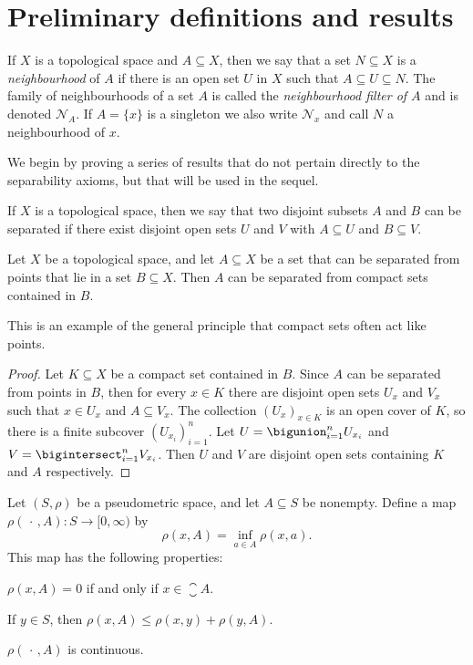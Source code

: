 \documentclass[article, a4paper, 11pt, oneside]{memoir}
\numberwithin{equation}{chapter}
\newcommand{\calN}{\mathcal{N}}
\newcommand{\nhoodfilter}[1]{\calN_{#1}}
\begin{document}
\chapter{Preliminary definitions and results}

If $X$ is a topological space and $A \subseteq X$, then we say that a set $N \subseteq X$ is a \emph{neighbourhood} of $A$ if there is an open set $U$ in $X$ such that $A \subseteq U \subseteq N$. The family of neighbourhoods of a set $A$ is called the \emph{neighbourhood filter of $A$} and is denoted $\nhoodfilter{A}$. If $A = \{x\}$ is a singleton we also write $\nhoodfilter{x}$ and call $N$ a neighbourhood of $x$.

We begin by proving a series of results that do not pertain directly to the separability axioms, but that will be used in the sequel.

If $X$ is a topological space, then we say that two disjoint subsets $A$ and $B$ can be separated if there exist disjoint open sets $U$ and $V$ with $A \subseteq U$ and $B \subseteq V$.

\begin{lemma}
    \label{thm:separating_from_compacts}
    Let $X$ be a topological space, and let $A \subseteq X$ be a set that can be separated from points that lie in a set $B \subseteq X$. Then $A$ can be separated from compact sets contained in $B$.
\end{lemma}
%
This is an example of the general principle that compact sets often act like points.

\begin{proof}
    Let $K \subseteq X$ be a compact set contained in $B$. Since $A$ can be separated from points in $B$, then for every $x \in K$ there are disjoint open sets $U_x$ and $V_x$ such that $x \in U_x$ and $A \subseteq V_x$. The collection $(U_x)_{x \in K}$ is an open cover of $K$, so there is a finite subcover $(U_{x_i})_{i=1}^n$. Let $U = \bigunion_{i=1}^n U_{x_i}$ and $V = \bigintersect_{i=1}^n V_{x_i}$. Then $U$ and $V$ are disjoint open sets containing $K$ and $A$ respectively.
\end{proof}


\begin{lemma}
    Let $(S,\rho)$ be a pseudometric space, and let $A \subseteq S$ be nonempty. Define a map $\rho(\,\cdot\,, A) \colon S \to [0, \infty)$ by
    \begin{equation*}
        \rho(x, A) = \inf_{a \in A} \rho(x,a).
    \end{equation*}
    This map has the following properties:
    \begin{enumlem}
        \item $\rho(x,A) = 0$ if and only if $x \in \closure{A}$.

        \item If $y \in S$, then $\rho(x,A) \leq \rho(x,y) + \rho(y,A)$.

        \item $\rho(\,\cdot\,, A)$ is continuous.
    \end{enumlem}
\end{lemma}
\end{document}
